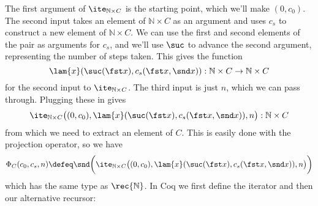 The first argument of $\ite_{\mathbb{N} \times C}$ is the starting point,
which we'll make $(0, c_{0})$.  The second input takes an element of
$\mathbb{N} \times C$ as an argument and uses $c_{s}$ to construct a new
element of $\mathbb{N} \times C$.  We can use the first and second elements of
the pair as arguments for $c_{s}$, and we'll use $\suc$ to advance the second
argument, representing the number of steps taken.  This gives the function
\[
  \lam{x}(\suc(\fst x), c_{s}(\fst x, \snd x)) 
  : \mathbb{N} \times C \to \mathbb{N} \times C
\]
for the second input to $\ite_{\mathbb{N} \times C}$.  The third input is just
$n$, which we can pass through.  Plugging these in gives
\[
  \ite_{\mathbb{N} \times C}\big(
  (0, c_{0}),
  \lam{x}(\suc(\fst x), c_{s}(\fst x, \snd x)),
  n
  \big)
  : \mathbb{N} \times C
\]
from which we need to extract an element of $C$.  This is easily done with the
projection operator, so we have
\[
  \Phi_{C}(c_{0}, c_{s}, n) \defeq
  \snd\bigg(
    \ite_{\mathbb{N} \times C}\big(
    (0, c_{0}),
    \lam{x}(\suc(\fst x), c_{s}(\fst x, \snd x)),
    n
    \big)
  \bigg)
\]
which has the same type as $\rec{\mathbb{N}}$.  In Coq we first define the
iterator and then our alternative recursor:

